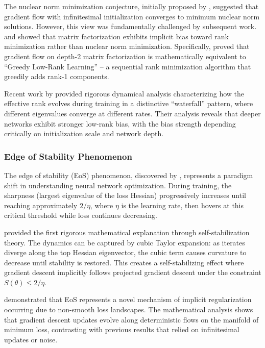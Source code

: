 \documentclass[11pt]{article}
\begin{document}
The nuclear norm minimization conjecture, initially proposed by \citet{gunasekar2017implicit}, suggested that gradient flow with infinitesimal initialization converges to minimum nuclear norm solutions. However, this view was fundamentally challenged by subsequent work. \citet{arora2019implicit} and \citet{li2020towards} showed that matrix factorization exhibits implicit bias toward rank minimization rather than nuclear norm minimization. Specifically, \citet{li2020towards} proved that gradient flow on depth-2 matrix factorization is mathematically equivalent to ``Greedy Low-Rank Learning'' -- a sequential rank minimization algorithm that greedily adds rank-1 components.

Recent work by \citet{chou2024gradient} provided rigorous dynamical analysis characterizing how the effective rank evolves during training in a distinctive ``waterfall'' pattern, where different eigenvalues converge at different rates. Their analysis reveals that deeper networks exhibit stronger low-rank bias, with the bias strength depending critically on initialization scale and network depth.

\subsubsection{Edge of Stability Phenomenon}

The edge of stability (EoS) phenomenon, discovered by \citet{cohen2021gradient}, represents a paradigm shift in understanding neural network optimization. During training, the sharpness (largest eigenvalue of the loss Hessian) progressively increases until reaching approximately $2/\eta$, where $\eta$ is the learning rate, then hovers at this critical threshold while loss continues decreasing.

\citet{damian2022self} provided the first rigorous mathematical explanation through self-stabilization theory. The dynamics can be captured by cubic Taylor expansion: as iterates diverge along the top Hessian eigenvector, the cubic term causes curvature to decrease until stability is restored. This creates a self-stabilizing effect where gradient descent implicitly follows projected gradient descent under the constraint $S(\theta) \leq 2/\eta$.

\citet{Arora2022Understanding} demonstrated that EoS represents a novel mechanism of implicit regularization occurring due to non-smooth loss landscapes. The mathematical analysis shows that gradient descent updates evolve along deterministic flows on the manifold of minimum loss, contrasting with previous results that relied on infinitesimal updates or noise.
\end{document}
